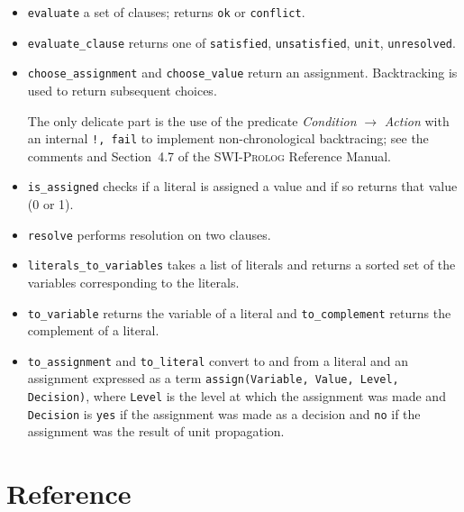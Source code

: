 \documentclass[11pt]{article}
\newcommand*{\p}[1]{\textup{\texttt{#1}}}
\newcommand*{\sw}{\textsc{SWI-Prolog}}
\begin{document}
\begin{itemize}

\item \p{evaluate} a set of clauses; returns \p{ok} or \p{conflict}.

\item \p{evaluate\_clause} returns one of \p{satisfied}, \p{unsatisfied},
\p{unit}, \p{unresolved}.

\item \p{choose\_assignment} and \p{choose\_value} return an assignment.
Backtracking is used to return subsequent choices.

The only delicate part is the use of the predicate \emph{Condition}
$\rightarrow$ \emph{Action} with an internal \p{!, fail} to implement
non-chronological backtracing; see the comments and Section~4.7 of the
\sw{} Reference Manual.

\item \p{is\_assigned} checks if a literal is assigned a value
and if so returns that value (0 or 1).

\item \p{resolve} performs resolution on two clauses.

\item \p{literals\_to\_variables} takes a list of literals and returns a
sorted set of the variables corresponding to the literals.

\item \p{to\_variable} returns the variable of a literal and
\p{to\_complement} returns the complement of a literal.

\item \p{to\_assignment} and \p{to\_literal} convert to and from a
literal and an assignment expressed as a term \p{assign(Variable, Value,
Level, Decision)}, where \p{Level} is the level at which the assignment
was made and \p{Decision} is \p{yes} if the assignment was
made as a decision and \p{no} if the assignment was the result of unit
propagation.

\end{itemize}





\newpage

\appendix
\section{Reference}

\bigskip\bigskip
\end{document}
